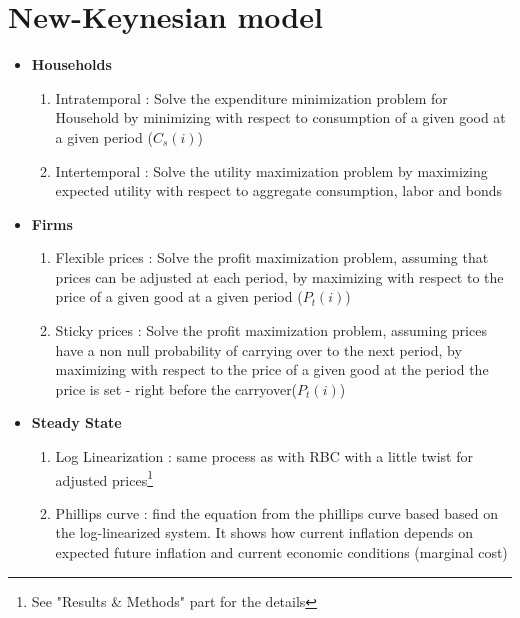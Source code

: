 \documentclass{article}
\begin{document}



\section{New-Keynesian model}

\begin{solutionoutlinebox}
\begin{itemize}
    \item \textbf{Households}
    \begin{enumerate}
        \item Intratemporal  : Solve the expenditure minimization problem for Household by minimizing with respect to consumption of a given good at a given period ($C_s(i)$)
        \item Intertemporal : Solve the utility maximization problem by maximizing expected utility with respect to aggregate consumption, labor and bonds 
    \end{enumerate}
    \item \textbf{Firms}
    \begin{enumerate}
        \item Flexible prices : Solve the profit maximization problem, assuming that prices can be adjusted at each period, by maximizing with respect to the price of a given good at a given period ($P_t(i)$)
        \item Sticky prices : Solve the profit maximization problem, assuming prices have a non null probability of carrying over to the next period, by maximizing with respect to the price of a given good at the period the price is set - right before the carryover($P_t(i)$)
    \end{enumerate}
    \item \textbf{Steady State}
    \begin{enumerate}
        \item Log Linearization : same process as with RBC with a little twist for adjusted prices\footnote{See "Results \& Methods" part for the details}
        \item Phillips curve : find the equation from the phillips curve based based on the log-linearized system. It shows how current inflation depends on expected future inflation and current economic conditions (marginal cost)
    \end{enumerate}
\end{itemize}
\end{solutionoutlinebox}
\end{document}
